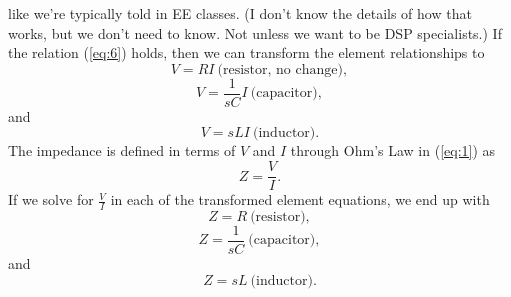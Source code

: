 \documentclass[12pt]{report}
\begin{document}
like we're typically told in EE classes. (I don't know the details of how that works, but we don't need to know. Not unless we want to be DSP specialists.)
If the relation (\ref{eq:6}) holds, then we can transform the element relationships to
\begin{equation}
\label{eq:7}
V = R I ~\text{(resistor, no change)},
\end{equation}
\begin{equation}
\label{eq:8}
V = \frac{1}{s C} I ~\text{(capacitor)},
\end{equation}
and
\begin{equation}
\label{eq:9}
V = s L I ~\text{(inductor)}.
\end{equation}
The impedance is defined in terms of $V$ and $I$ through Ohm's Law in (\ref{eq:1}) as
\begin{equation}
\label{eq:10}
Z = \frac{V}{I}.
\end{equation}
If we solve for $\frac{V}{I}$ in each of the transformed element equations, we end up with
\begin{equation}
\label{eq:11}
Z = R ~\text{(resistor)},
\end{equation}
\begin{equation}
\label{eq:12}
Z = \frac{1}{s C} ~\text{(capacitor)},
\end{equation}
and
\begin{equation}
\label{eq:13}
Z = s L ~\text{(inductor)}.
\end{equation}
\end{document}
